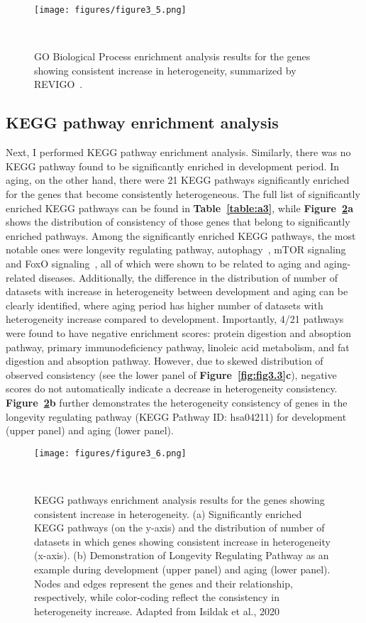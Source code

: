 \begin{landscape}
\begin{figure}[h]
    \centering
    \texttt{[image: figures/figure3\_5.png]}
    \caption{GO Biological Process enrichment analysis results for the genes showing consistent increase in heterogeneity, summarized by REVIGO~\cite{Supek2011}.
    }~\label{fig:fig3.5}
\end{figure}
\end{landscape}

\subsection{KEGG pathway enrichment analysis}
Next, I performed KEGG pathway enrichment analysis. Similarly, there was no KEGG pathway found to be significantly enriched in development period.
In aging, on the other hand, there were 21 KEGG pathways significantly enriched for the genes that become consistently heterogeneous. 
The full list of significantly enriched KEGG pathways can be found in \textbf{Table~\ref{table:a3}},
while \textbf{Figure~\ref{fig:fig3.6}a} shows the distribution of consistency of those genes that belong to significantly enriched pathways. 
Among the significantly enriched KEGG pathways, the most notable ones were longevity regulating pathway, autophagy~\cite{Rubinsztein2011}, mTOR signaling~\cite{Johnson2013} and FoxO signaling~\cite{Martins2016}, 
all of which were shown to be related to aging and aging-related diseases.
Additionally, the difference in the distribution of number of datasets with increase in heterogeneity between development and aging can be clearly identified,
where aging period has higher number of datasets with heterogeneity increase compared to development.
Importantly, 4/21 pathways were found to have negative enrichment scores: protein digestion and absoption pathway, primary immunodeficiency pathway, linoleic acid metabolism, and fat digestion and absoption pathway.
However, due to skewed distribution of observed consistency (see the lower panel of \textbf{Figure~\ref{fig:fig3.3}c}), 
negative scores do not automatically indicate a decrease in heterogeneity consistency. \textbf{Figure~\ref{fig:fig3.6}b} further demonstrates the heterogeneity consistency of genes in the longevity regulating pathway 
(KEGG Pathway ID: hsa04211) for development (upper panel) and aging (lower panel).

\begin{figure}[h]
    \centering
    \texttt{[image: figures/figure3\_6.png]}
    \caption{KEGG pathways enrichment analysis results for the genes showing consistent increase in heterogeneity.
    (a) Significantly enriched KEGG pathways (on the y-axis) and the distribution of number of datasets in which genes showing consistent increase in heterogeneity (x-axis). 
    (b) Demonstration of Longevity Regulating Pathway as an example during development (upper panel) and aging (lower panel). 
    Nodes and edges represent the genes and their relationship, respectively, while color-coding reflect the consistency in heterogeneity increase.
    Adapted from Isildak et al., 2020
    }~\label{fig:fig3.6}
\end{figure}

